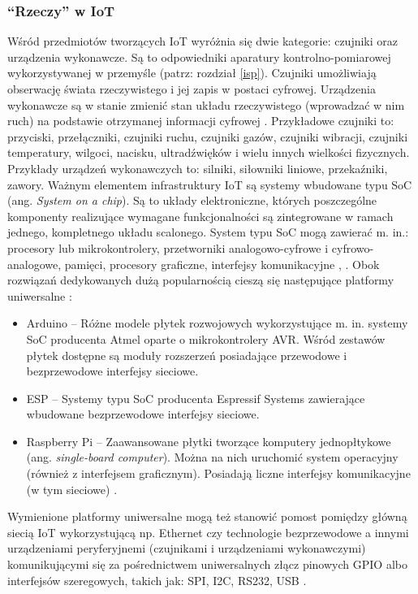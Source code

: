 \documentclass[a4paper, 12pt, twoside]{article}
\begin{document}
\subsubsection{``Rzeczy'' w IoT}

Wśród przedmiotów tworzących IoT wyróżnia się dwie kategorie: 
czujniki oraz urządzenia wykonawcze. Są to odpowiedniki aparatury kontrolno-pomiarowej 
wykorzystywanej w przemyśle (patrz: rozdział \ref{isp}). Czujniki umożliwiają
obserwację świata rzeczywistego i jej zapis w postaci cyfrowej.  
Urządzenia wykonawcze są w stanie zmienić stan układu rzeczywistego (wprowadzać w nim ruch)
na podstawie otrzymanej informacji cyfrowej \cite{iot-hype-to-reality}.
Przykładowe czujniki to: przyciski, przełączniki, czujniki ruchu, czujniki gazów,
czujniki wibracji, czujniki temperatury, wilgoci,
nacisku, ultradźwięków i wielu innych wielkości fizycznych. Przykłady urządzeń
wykonawczych to: silniki, siłowniki liniowe, przekaźniki, zawory. Ważnym elementem
infrastruktury IoT są systemy wbudowane typu SoC (ang. \emph{System on a chip}).  
Są to układy elektroniczne, których poszczególne komponenty realizujące wymagane 
funkcjonalności są zintegrowane w ramach jednego, kompletnego układu scalonego. 
System typu SoC mogą zawierać m. in.: procesory lub mikrokontrolery, przetworniki
analogowo-cyfrowe i cyfrowo-analogowe, pamięci, procesory graficzne, interfejsy komunikacyjne \cite{intro-to-iot}, \cite{soc}. 
Obok rozwiązań dedykowanych dużą popularnością cieszą się następujące platformy uniwersalne \cite{intro-to-iot}:

\begin{itemize}
    \item Arduino -- Różne modele płytek rozwojowych wykorzystujące m. in. systemy
    SoC producenta Atmel oparte o mikrokontrolery AVR. Wśród zestawów płytek
    dostępne są moduły rozszerzeń posiadające przewodowe i bezprzewodowe interfejsy sieciowe.
    \item ESP -- Systemy typu SoC producenta Espressif Systems zawierające wbudowane
    bezprzewodowe interfejsy sieciowe.
    \item Raspberry Pi -- Zaawansowane płytki tworzące komputery jednopłtykowe (ang. \emph{single-board computer}).    
    Można na nich uruchomić system operacyjny (również z interfejsem graficznym). Posiadają liczne 
    interfejsy komunikacyjne (w tym sieciowe) \cite{rpi}. 
\end{itemize}

Wymienione platformy uniwersalne mogą też stanowić pomost pomiędzy główną
siecią IoT wykorzystującą np. Ethernet czy technologie bezprzewodowe a innymi urządzeniami
peryferyjnemi (czujnikami i urządzeniami wykonawczymi) komunikującymi się za pośrednictwem 
uniwersalnych złącz pinowych GPIO albo interfejsów szeregowych, 
takich jak: SPI, I2C, RS232, USB \cite{intro-to-iot}.
\end{document}

